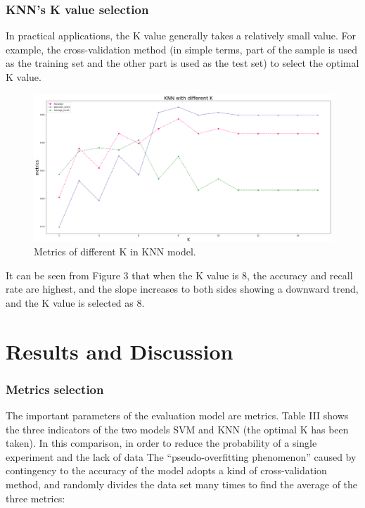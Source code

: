 \documentclass[conference]{IEEEtran}
\begin{document}
\subsubsection{KNN's K value selection}
In practical applications, the K value generally takes a relatively small value. For example, the cross-validation method (in simple terms, part of the sample is used as the training set and the other part is used as the test set) to select the optimal K value.


\begin{figure}[htbp]
\centerline{\includegraphics[scale=0.15]{P3.png}}
\caption{Metrics of different K in KNN model.}
\label{fig3}
\end{figure}

It can be seen from Figure 3 that when the K value is 8, the accuracy and recall rate are highest, and the slope increases to both sides showing a downward trend, and the K value is selected as 8.




\section{Results and Discussion}
\subsubsection{Metrics selection}
The important parameters of the evaluation model are metrics. Table III shows the three indicators of the two models SVM and KNN (the optimal K has been taken). In this comparison, in order to reduce the probability of a single experiment and the lack of data The “pseudo-overfitting phenomenon” caused by contingency to the accuracy of the model adopts a kind of cross-validation method, and randomly divides the data set many times to find the average of the three metrics: 
\end{document}

